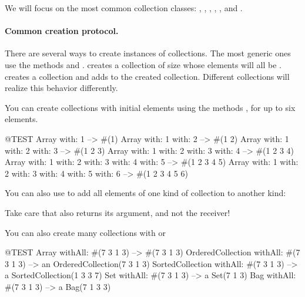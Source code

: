 \documentclass[a4paper,10pt,twoside]{book}
\begin{document}
We will focus on the most common collection classes: , , , , , and .

\paragraph{Common creation protocol.}
There are several ways to create instances of collections.
The most generic ones use the methods  and .
 creates a collection of size  whose elements will all be .
  creates a collection and adds  to the created collection.
Different collections will realize this behavior differently.

You can create collections with initial elements using the methods ,  \etc for up to six elements.

\begin{code}{@TEST}
Array with: 1 --> #(1)
Array with: 1 with: 2 --> #(1 2)
Array with: 1 with: 2 with: 3 --> #(1 2 3)
Array with: 1 with: 2 with: 3 with: 4 --> #(1 2 3 4)
Array with: 1 with: 2 with: 3 with: 4 with: 5 --> #(1 2 3 4 5)
Array with: 1 with: 2 with: 3 with: 4 with: 5 with: 6 --> #(1 2 3 4 5 6)
\end{code}

You can also use  to add all elements of one kind of collection to another kind:

\noindent
Take care that  also returns its argument, and not the receiver!

You can also create many collections with  or 

\begin{code}{@TEST}
Array withAll: #(7 3 1 3)                      --> #(7 3 1 3)
OrderedCollection withAll: #(7 3 1 3) --> an OrderedCollection(7 3 1 3)
SortedCollection withAll: #(7 3 1 3)    --> a SortedCollection(1 3 3 7)
Set withAll: #(7 3 1 3)                         --> a Set(7 1 3)
Bag withAll: #(7 3 1 3)                        --> a Bag(7 1 3 3)
\end{code}
\end{document}
